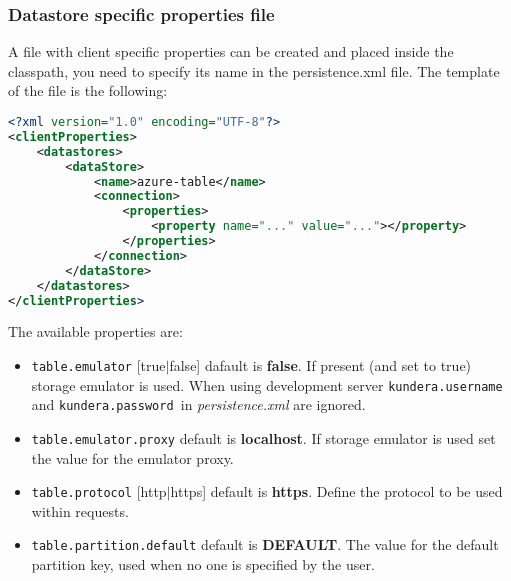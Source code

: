 \subsubsection{Datastore specific properties file}
A file with client specific properties can be created and placed inside the classpath, you need to specify its name in the persistence.xml file.
The template of the file is the following:

\begin{lstlisting}[language=XML, caption=Azure Tables - datastore specific configuration]
<?xml version="1.0" encoding="UTF-8"?>
<clientProperties>
    <datastores>
        <dataStore>
            <name>azure-table</name>
            <connection>
                <properties>
                    <property name="..." value="..."></property>
                </properties>
            </connection>
        </dataStore>
    </datastores>
</clientProperties>
\end{lstlisting}

\noindent The available properties are:
\begin{itemize}
\item \texttt{table.emulator} [true$\vert$false] dafault is \textbf{false}. If present (and set to true) storage emulator is used. When using development server \texttt{kundera.username} and \texttt{kundera.password }in \textit{persistence.xml} are ignored.
\item \texttt{table.emulator.proxy} default is \textbf{localhost}. If storage emulator is used set the value for the emulator proxy.
\item \texttt{table.protocol} [http$\vert$https] default is \textbf{https}. Define the protocol to be used within requests.
\item \texttt{table.partition.default} default is \textbf{DEFAULT}.
The value for the default partition key, used when no one is specified by the user.
\end{itemize}